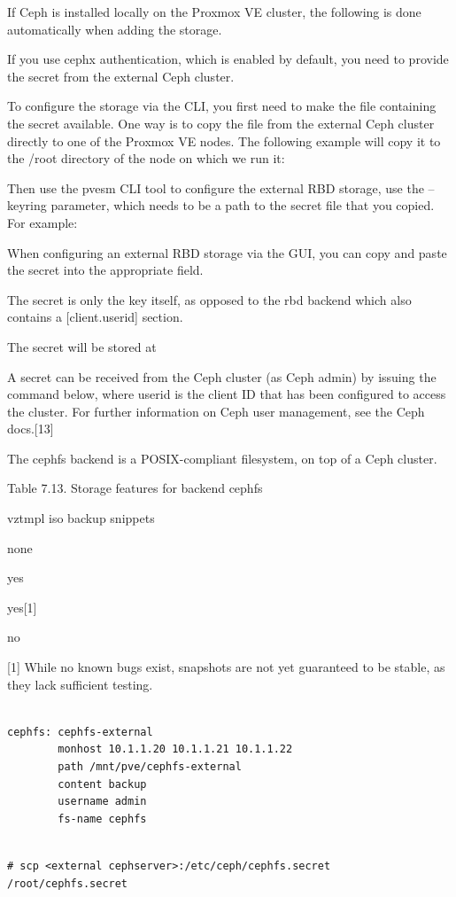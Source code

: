 If Ceph is installed locally on the Proxmox VE cluster, the following is done automatically when adding the storage.

If you use cephx authentication, which is enabled by default, you need to provide the secret from the external Ceph cluster.

To configure the storage via the CLI, you first need to make the file containing the secret available. One way is to copy the file from the external Ceph cluster directly to one of the Proxmox VE nodes. The following example will copy it to the /root directory of the node on which we run it:

Then use the pvesm CLI tool to configure the external RBD storage, use the --keyring parameter, which needs to be a path to the secret file that you copied. For example:

When configuring an external RBD storage via the GUI, you can copy and paste the secret into the appropriate field.

The secret is only the key itself, as opposed to the rbd backend which also contains a [client.userid] section.

The secret will be stored at

A secret can be received from the Ceph cluster (as Ceph admin) by issuing the command below, where userid is the client ID that has been configured to access the cluster. For further information on Ceph user management, see the Ceph docs.[13]

The cephfs backend is a POSIX-compliant filesystem, on top of a Ceph cluster.

Table 7.13. Storage features for backend cephfs

vztmpl iso backup snippets

none

yes

yes[1]

no

[1] While no known bugs exist, snapshots are not yet guaranteed to be stable, as they lack sufficient testing.

\begin{lstlisting}

cephfs: cephfs-external
        monhost 10.1.1.20 10.1.1.21 10.1.1.22
        path /mnt/pve/cephfs-external
        content backup
        username admin
        fs-name cephfs

\end{lstlisting}

\begin{lstlisting}

# scp <external cephserver>:/etc/ceph/cephfs.secret /root/cephfs.secret

\end{lstlisting}

